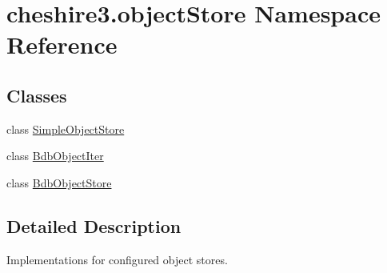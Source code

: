 \hypertarget{namespacecheshire3_1_1object_store}{\section{cheshire3.\-object\-Store Namespace Reference}
\label{namespacecheshire3_1_1object_store}
}
\subsection*{Classes}
\begin{DoxyCompactItemize}
\item 
class \hyperlink{classcheshire3_1_1object_store_1_1_simple_object_store}{Simple\-Object\-Store}
\item 
class \hyperlink{classcheshire3_1_1object_store_1_1_bdb_object_iter}{Bdb\-Object\-Iter}
\item 
class \hyperlink{classcheshire3_1_1object_store_1_1_bdb_object_store}{Bdb\-Object\-Store}
\end{DoxyCompactItemize}


\subsection{Detailed Description}
\begin{DoxyVerb}Implementations for configured object stores.\end{DoxyVerb}
 